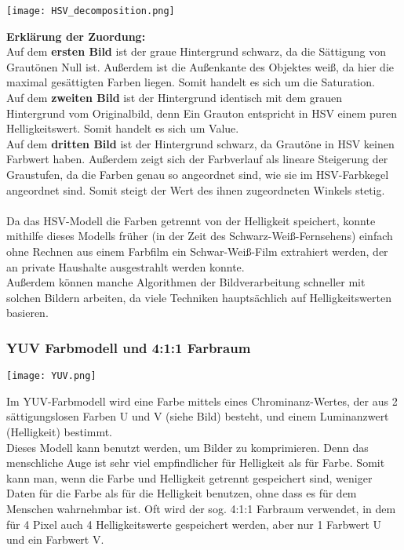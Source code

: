 \texttt{[image: HSV\_decomposition.png]}

\textbf{Erklärung der Zuordung:}\\
Auf dem \textbf{ersten Bild} ist der graue Hintergrund schwarz, da die Sättigung von Grautönen Null ist. Außerdem ist die Außenkante des Objektes weiß, da hier die maximal gesättigten Farben liegen. Somit handelt es sich um die Saturation.\\
Auf dem \textbf{zweiten Bild} ist der Hintergrund identisch mit dem grauen Hintergrund vom Originalbild, denn Ein Grauton entspricht in HSV einem puren Helligkeitswert. Somit handelt es sich um Value.\\
Auf dem \textbf{dritten Bild} ist der Hintergrund schwarz, da Grautöne in HSV keinen Farbwert haben. Außerdem zeigt sich der Farbverlauf als lineare Steigerung der Graustufen, da die Farben genau so angeordnet sind, wie sie im HSV-Farbkegel angeordnet sind. Somit steigt der Wert des ihnen zugeordneten Winkels stetig.\\
\\
Da das HSV-Modell die Farben getrennt von der Helligkeit speichert, konnte mithilfe dieses Modells früher (in der Zeit des Schwarz-Weiß-Fernsehens) einfach ohne Rechnen aus einem Farbfilm ein Schwar-Weiß-Film extrahiert werden, der an private Haushalte ausgestrahlt werden konnte.\\
Außerdem können manche Algorithmen der Bildverarbeitung schneller mit solchen Bildern arbeiten, da viele Techniken hauptsächlich auf Helligkeitswerten basieren.

\subsubsection{YUV Farbmodell und 4:1:1 Farbraum}

\texttt{[image: YUV.png]}

Im YUV-Farbmodell wird eine Farbe mittels eines Chrominanz-Wertes, der aus 2 sättigungslosen Farben U und V (siehe Bild) besteht, und einem Luminanzwert (Helligkeit) bestimmt.\\
Dieses Modell kann benutzt werden, um Bilder zu komprimieren. Denn das menschliche Auge ist sehr viel empfindlicher für Helligkeit als für Farbe. Somit kann man, wenn die Farbe und Helligkeit getrennt gespeichert sind, weniger Daten für die Farbe als für die Helligkeit benutzen, ohne dass es für dem Menschen wahrnehmbar ist. Oft wird der sog. 4:1:1 Farbraum verwendet, in dem für 4 Pixel auch 4 Helligkeitswerte gespeichert werden, aber nur 1 Farbwert U und ein Farbwert V.